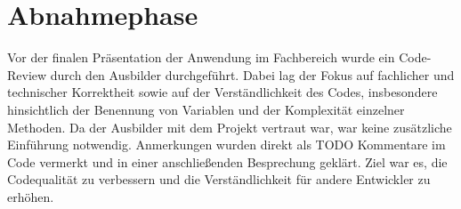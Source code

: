 \section{Abnahmephase} 
\label{sec:Abnahmephase}
	Vor der finalen Präsentation der Anwendung im Fachbereich wurde ein Code-Review durch den Ausbilder durchgeführt.
	Dabei lag der Fokus auf fachlicher und technischer Korrektheit sowie auf der Verständlichkeit des Codes,
	insbesondere hinsichtlich der Benennung von Variablen und der Komplexität einzelner Methoden.
	Da der Ausbilder mit dem Projekt vertraut war, war keine zusätzliche Einführung notwendig.
	Anmerkungen wurden direkt als TODO Kommentare im Code vermerkt und in einer anschließenden Besprechung geklärt.
	Ziel war es, die Codequalität zu verbessern und die Verständlichkeit für andere Entwickler zu erhöhen.

